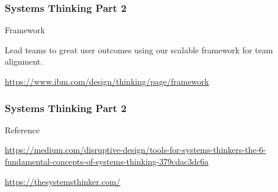 \newpage
\begin{frame}
\frametitle{ Systems Thinking  Part 2 }
\begin{block}{ Framework}

Lead teams to great user outcomes using our scalable framework for team alignment.

\url{https://www.ibm.com/design/thinking/page/framework}

\end{block}
\end{frame}


\newpage
\begin{frame}
\frametitle{ Systems Thinking  Part 2 }
\begin{block}{ Reference}

 

\url{https://medium.com/disruptive-design/tools-for-systems-thinkers-the-6-fundamental-concepts-of-systems-thinking-379cdac3dc6a}

\url{https://thesystemsthinker.com/}

\end{block}
\end{frame}
